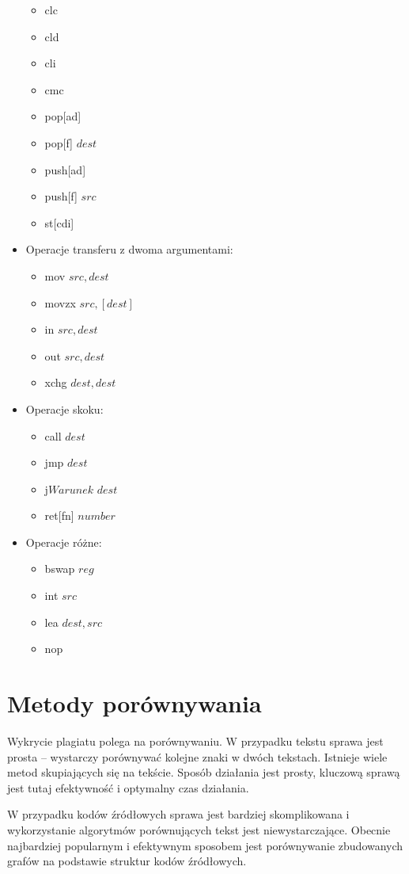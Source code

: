\documentclass[a4paper,12pt]{article}
\begin{document}
\begin{itemize}
\begin{itemize}
	\item clc
	\item cld
	\item cli
	\item cmc
	\item pop[ad]
	\item pop[f] $dest$
	\item push[ad]
	\item push[f] $src$
	\item st[cdi]
	\end{itemize}
\item Operacje transferu z dwoma argumentami:
	\begin{itemize}
	\item mov $src, dest$
	\item movzx $src, [dest]$
	\item in $src, dest$
	\item out $src, dest$
	\item xchg $dest, dest$
	\end{itemize}
\item Operacje skoku:
	\begin{itemize}
	\item call $dest$
	\item jmp $dest$
	\item j$Warunek$ $dest$
	\item ret[fn] $number$
	\end{itemize}
\item Operacje różne:
	\begin{itemize}
	\item bswap $reg$
	\item int $src$
	\item lea $dest, src$
	\item nop
	\end{itemize}
\end{itemize}

\newpage

\section{Metody porównywania}

Wykrycie plagiatu polega na porównywaniu. W przypadku tekstu sprawa jest prosta -- wystarczy porównywać kolejne znaki w dwóch tekstach. Istnieje wiele metod skupiających się na tekście. Sposób działania jest prosty, kluczową sprawą jest tutaj efektywność i optymalny czas działania.

W przypadku kodów źródłowych sprawa jest bardziej skomplikowana i wykorzystanie algorytmów porównujących tekst jest niewystarczające. Obecnie najbardziej popularnym i efektywnym sposobem jest porównywanie zbudowanych grafów na podstawie struktur kodów źródłowych.
\end{document}
